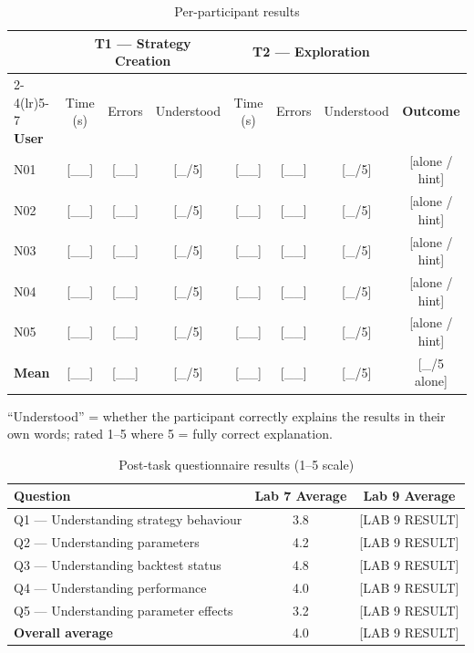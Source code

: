 \documentclass[10pt,a4paper]{article}
\begin{document}
\begin{table}[H]
\centering
\caption{Per-participant results}
\label{tab:results}
\small
\begin{tabularx}{\textwidth}{l *{3}{c} *{3}{c} c}
\toprule
& \multicolumn{3}{c}{\textbf{T1 --- Strategy Creation}} & \multicolumn{3}{c}{\textbf{T2 --- Exploration}} & \\
\cmidrule(lr){2-4}\cmidrule(lr){5-7}
\textbf{User} & Time (s) & Errors & Understood & Time (s) & Errors & Understood & \textbf{Outcome} \\
\midrule
N01 & [\_\_] & [\_\_] & [\_/5] & [\_\_] & [\_\_] & [\_/5] & [alone / hint] \\
N02 & [\_\_] & [\_\_] & [\_/5] & [\_\_] & [\_\_] & [\_/5] & [alone / hint] \\
N03 & [\_\_] & [\_\_] & [\_/5] & [\_\_] & [\_\_] & [\_/5] & [alone / hint] \\
N04 & [\_\_] & [\_\_] & [\_/5] & [\_\_] & [\_\_] & [\_/5] & [alone / hint] \\
N05 & [\_\_] & [\_\_] & [\_/5] & [\_\_] & [\_\_] & [\_/5] & [alone / hint] \\
\midrule
\textbf{Mean} & [\_\_] & [\_\_] & [\_/5] & [\_\_] & [\_\_] & [\_/5] & [\_/5 alone] \\
\bottomrule
\end{tabularx}
\end{table}

``Understood'' = whether the participant correctly explains the results in their own words; rated 1--5 where 5 = fully correct explanation.

\begin{table}[H]
\centering
\caption{Post-task questionnaire results (1--5 scale)}
\label{tab:questionnaire}
\begin{tabularx}{\textwidth}{X c c}
\toprule
\textbf{Question} & \textbf{Lab 7 Average} & \textbf{Lab 9 Average} \\
\midrule
Q1 --- Understanding strategy behaviour       & 3.8 & [LAB 9 RESULT] \\
Q2 --- Understanding parameters               & 4.2 & [LAB 9 RESULT] \\
Q3 --- Understanding backtest status           & 4.8 & [LAB 9 RESULT] \\
Q4 --- Understanding performance               & 4.0 & [LAB 9 RESULT] \\
Q5 --- Understanding parameter effects         & 3.2 & [LAB 9 RESULT] \\
\midrule
\textbf{Overall average}                       & 4.0 & [LAB 9 RESULT] \\
\bottomrule
\end{tabularx}
\end{table}
\end{document}
